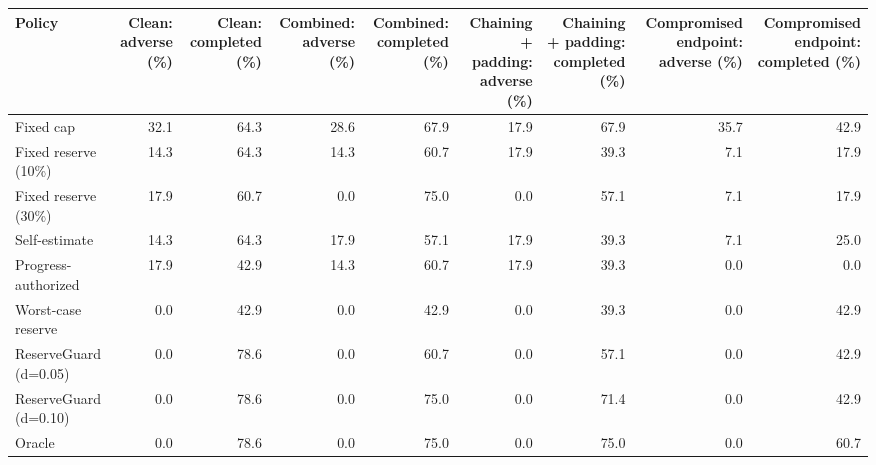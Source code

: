 \begin{tabular}{lrrrrrrrr}
\toprule
Policy & Clean: adverse (\%) & Clean: completed (\%) & Combined: adverse (\%) & Combined: completed (\%) & Chaining + padding: adverse (\%) & Chaining + padding: completed (\%) & Compromised endpoint: adverse (\%) & Compromised endpoint: completed (\%) \\
\midrule
Fixed cap & 32.1 & 64.3 & 28.6 & 67.9 & 17.9 & 67.9 & 35.7 & 42.9 \\
Fixed reserve (10\%) & 14.3 & 64.3 & 14.3 & 60.7 & 17.9 & 39.3 & 7.1 & 17.9 \\
Fixed reserve (30\%) & 17.9 & 60.7 & 0.0 & 75.0 & 0.0 & 57.1 & 7.1 & 17.9 \\
Self-estimate & 14.3 & 64.3 & 17.9 & 57.1 & 17.9 & 39.3 & 7.1 & 25.0 \\
Progress-authorized & 17.9 & 42.9 & 14.3 & 60.7 & 17.9 & 39.3 & 0.0 & 0.0 \\
Worst-case reserve & 0.0 & 42.9 & 0.0 & 42.9 & 0.0 & 39.3 & 0.0 & 42.9 \\
ReserveGuard (d=0.05) & 0.0 & 78.6 & 0.0 & 60.7 & 0.0 & 57.1 & 0.0 & 42.9 \\
ReserveGuard (d=0.10) & 0.0 & 78.6 & 0.0 & 75.0 & 0.0 & 71.4 & 0.0 & 42.9 \\
Oracle & 0.0 & 78.6 & 0.0 & 75.0 & 0.0 & 75.0 & 0.0 & 60.7 \\
\bottomrule
\end{tabular}
